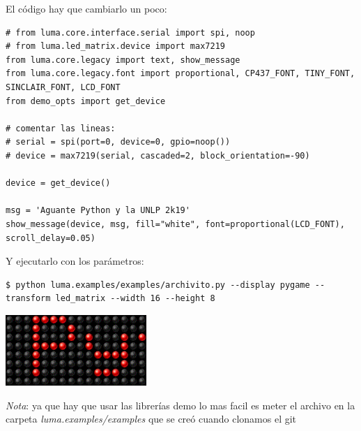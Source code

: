 El código hay que cambiarlo un poco:
\begin{verbatim}
# from luma.core.interface.serial import spi, noop
# from luma.led_matrix.device import max7219
from luma.core.legacy import text, show_message
from luma.core.legacy.font import proportional, CP437_FONT, TINY_FONT, SINCLAIR_FONT, LCD_FONT
from demo_opts import get_device

# comentar las lineas:
# serial = spi(port=0, device=0, gpio=noop())
# device = max7219(serial, cascaded=2, block_orientation=-90)

device = get_device()

msg = 'Aguante Python y la UNLP 2k19'
show_message(device, msg, fill="white", font=proportional(LCD_FONT), scroll_delay=0.05)
\end{verbatim}

Y ejecutarlo con los parámetros:
\begin{Verbatim}[breaklines=true, breakanywhere=true]
$ python luma.examples/examples/archivito.py --display pygame --transform led_matrix --width 16 --height 8
\end{Verbatim}
\includegraphics[width=0.4\textwidth,keepaspectratio]{img/gif.png}

\textbar{} \emph{Nota}: ya que hay que usar las librerías demo lo mas
facil es meter el archivo en la carpeta \emph{luma.examples/examples}
que se creó cuando clonamos el git \textbar{}
